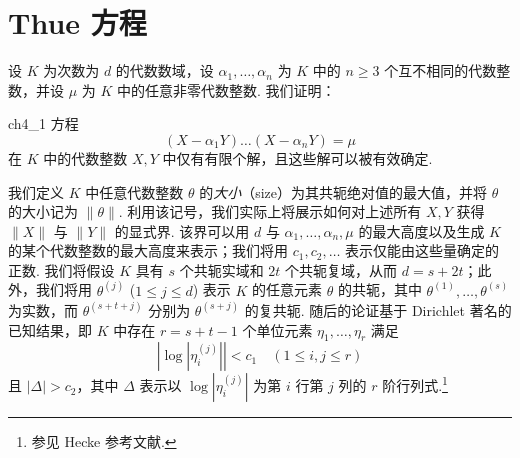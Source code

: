 \section{Thue 方程}\label{sec:ch4_2}

设 $K$ 为次数为 $d$ 的代数数域，设 $\alpha_1, \dots, \alpha_n$ 为 $K$ 中的 $n \ge 3$ 个互不相同的代数整数，并设 $\mu$ 为 $K$ 中的任意非零代数整数. 我们证明：

\begin{mythm}{}{ch4_1}
方程
\[
(X - \alpha_1 Y) \dots (X - \alpha_n Y) = \mu
\]
在 $K$ 中的代数整数 $X, Y$ 中仅有有限个解，且这些解可以被有效确定.
\end{mythm}

我们定义 $K$ 中任意代数整数 $\theta$ 的\textit{大小}（size）为其共轭绝对值的最大值，并将 $\theta$ 的大小记为 $\|\theta\|$. 利用该记号，我们实际上将展示如何对上述所有 $X, Y$ 获得 $\|X\|$ 与 $\|Y\|$ 的显式界. 该界可以用 $d$ 与 $\alpha_1, \dots, \alpha_n, \mu$ 的最大高度以及生成 $K$ 的某个代数整数的最大高度来表示；我们将用 $c_1, c_2, \dots$ 表示仅能由这些量确定的正数. 我们将假设 $K$ 具有 $s$ 个共轭实域和 $2t$ 个共轭复域，从而 $d = s + 2t$；此外，我们将用 $\theta^{(j)}$ ($1 \le j \le d$) 表示 $K$ 的任意元素 $\theta$ 的共轭，其中 $\theta^{(1)}, \dots, \theta^{(s)}$ 为实数，而 $\theta^{(s+t+j)}$ 分别为 $\theta^{(s+j)}$ 的复共轭. 随后的论证基于 Dirichlet 著名的已知结果，即 $K$ 中存在 $r = s + t - 1$ 个单位元素 $\eta_1, \dots, \eta_r$ 满足
\[
\left|\log\left|\eta_i^{(j)}\right|\right| < c_1 \quad (1 \le i, j \le r)
\]
且 $|\Delta| > c_2$，其中 $\Delta$ 表示以 $\log|\eta_i^{(j)}|$ 为第 $i$ 行第 $j$ 列的 $r$ 阶行列式.\footnote{参见 Hecke 参考文献.}

